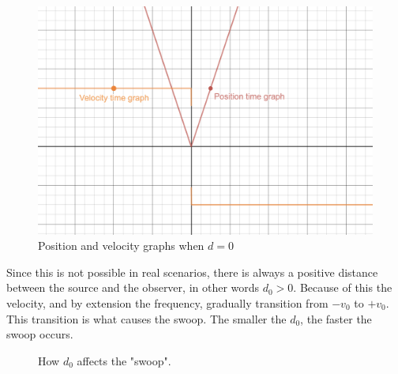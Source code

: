 \documentclass[12pt]{article}
\begin{document}
\begin{figure}[H]
	\centering
	\includegraphics[width=5in]{zerodistance}
	\caption{Position and velocity graphs when $d=0$}
	\label{fig:zero}
\end{figure}

Since this is not possible in real scenarios, there is always a positive distance between the source and the observer, in other words $d_0 > 0$. Because of this the velocity, and by extension the frequency, gradually transition from $-v_0$ to $+v_0$. This transition is what causes the swoop. The smaller the $d_0$, the faster the swoop occurs.

\begin{figure}[H]
  \centering
  \hfill
  \caption{How $d_0$ affects the "swoop".}
\end{figure}
\end{document}
